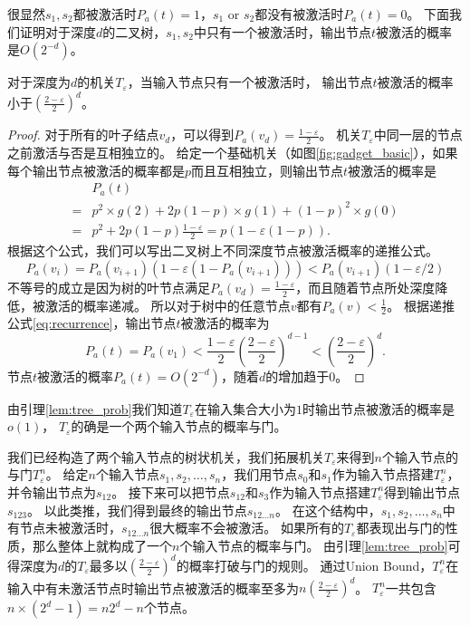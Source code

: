 很显然$s_1,s_2$都被激活时$P_a(t)=1$，$s_1$ or $s_2$都没有被激活时$P_a(t)=0$。
下面我们证明对于深度$d$的二叉树，$s_1,s_2$中只有一个被激活时，输出节点$t$被激活的概率是$O(2^{-d})$。
\begin{lemma}
\label{lem:tree_prob}
对于深度为$d$的机关$T_\varepsilon$，当输入节点只有一个被激活时，
输出节点$t$被激活的概率小于$(\frac{2-\varepsilon}{2})^{d}$。
\end{lemma}
\begin{proof}
对于所有的叶子结点$v_d$，可以得到$P_a(v_d) = \frac{1-\varepsilon}{2}$。
机关$T_\varepsilon$中同一层的节点之前激活与否是互相独立的。
给定一个基础机关（如图\ref{fig:gadget_basic}），如果每个输出节点被激活的概率都是$p$而且互相独立，则输出节点$t$被激活的概率是
\begin{equation*}
\begin{array}{ll}
& P_a(t) \\
= & p^2\times g(2) + 2p(1-p)\times g(1) + (1-p)^2\times g(0) \\
= & p^2 + 2p(1-p)\frac{1-\varepsilon}{2} = p(1-\varepsilon(1-p)).
\end{array}
\end{equation*}
根据这个公式，我们可以写出二叉树上不同深度节点被激活概率的递推公式。
\begin{equation}
\label{eq:recurrence}
P_a(v_i) = P_a(v_{i+1})(1-\varepsilon(1-P_a(v_{i+1}))) <  P_a(v_{i+1})(1-\varepsilon/2)
\end{equation}
不等号的成立是因为树的叶节点满足$P_a(v_d) = \frac{1-\varepsilon}{2}$，而且随着节点所处深度降低，被激活的概率递减。
所以对于树中的任意节点$v$都有$P_a(v) < \frac{1}{2}$。
根据递推公式\ref{eq:recurrence}，输出节点$t$被激活的概率为
\begin{equation*}
\label{eq:p_a_t}
 P_a(t) 
=  P_a(v_1) 
<  \frac{1-\varepsilon}{2}(\frac{2-\varepsilon}{2})^{d-1} 
<  (\frac{2-\varepsilon}{2})^{d}.
\end{equation*}
节点$t$被激活的概率$P_a(t) = O(2^{-d})$，随着$d$的增加趋于$0$。
\end{proof}
由引理\ref{lem:tree_prob}我们知道$T_\varepsilon$在输入集合大小为$1$时输出节点被激活的概率是$o(1)$，
$T_\varepsilon$的确是一个两个输入节点的概率与门。


我们已经构造了两个输入节点的树状机关，我们拓展机关$T_\varepsilon$来得到$n$个输入节点的与门$T_\varepsilon^n$。
给定$n$个输入节点$s_1, s_2, \dots, s_n$，我们用节点$s_0$和$s_1$作为输入节点搭建$T_\varepsilon^n$，并令输出节点为$s_{12}$。
接下来可以把节点$s_{12}$和$s_{3}$作为输入节点搭建$T_\varepsilon^n$得到输出节点$s_{123}$。
以此类推，我们得到最终的输出节点$s_{12\dots n}$。
在这个结构中，$s_1, s_2, \dots, s_n$中有节点未被激活时，$s_{12\dots n}$很大概率不会被激活。
如果所有的$T_\varepsilon$都表现出与门的性质，那么整体上就构成了一个$n$个输入节点的概率与门。
由引理\ref{lem:tree_prob}可得深度为$d$的$T_\varepsilon$最多以$(\frac{2-\varepsilon}{2})^{d}$的概率打破与门的规则。
通过Union Bound，$T_\varepsilon^n$在输入中有未激活节点时输出节点被激活的概率至多为$n(\frac{2-\varepsilon}{2})^{d}$。
$T_\varepsilon^n$一共包含$n\times(2^d-1) = n2^d-n$个节点。





